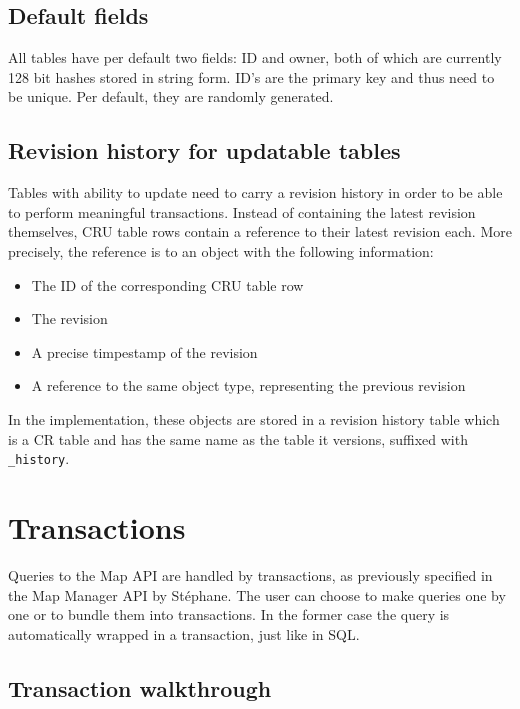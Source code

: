 \documentclass{article}
\begin{document}
\subsection{Default fields}

All tables have per default two fields: ID and owner, both of which are
currently 128 bit hashes stored in string form. ID's are the primary key and
thus need to be unique. Per default, they are randomly generated.

\subsection{Revision history for updatable tables}

Tables with ability to update need to carry a revision history in order to be
able to perform meaningful transactions.
Instead of containing the latest revision themselves, CRU table rows contain
a reference to their latest revision each. More precisely, the reference is to
an object with the following information:

\begin{itemize} \itemsep0em
  \item The ID of the corresponding CRU table row
  \item The revision
  \item A precise timpestamp of the revision
  \item A reference to the same object type, representing the previous revision
\end{itemize}

In the implementation, these objects are stored in a revision history table
which is a CR table and has the same name as the table it versions, suffixed
with {\tt \_history}.

\section{Transactions}\label{transactions}

Queries to the Map API are handled by transactions, as previously specified in
the Map Manager API by Stéphane. The user can choose to make queries one by one
or to bundle them into transactions. In the former case the query is
automatically wrapped in a transaction, just like in SQL. 

\subsection{Transaction walkthrough}
\end{document}
